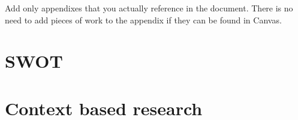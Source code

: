 Add only appendixes that you actually reference in the document.
There is no need to add pieces of work to the appendix if they can be found in Canvas.

\chapter{SWOT}
\label{ch:swot}


\chapter{Context based research}
\label{ch:context_based_research}


